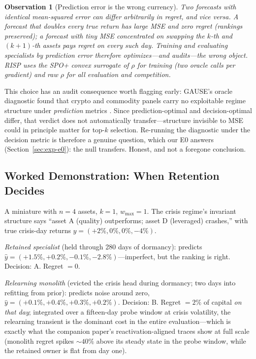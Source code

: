 \documentclass[10pt]{article}
\newtheorem{observation}{Observation}
\newcommand{\nm}{\textsc{RISP}}
\begin{document}
\begin{observation}[Prediction error is the wrong currency]
Two forecasts with identical mean-squared error can differ arbitrarily in
regret, and vice versa. A forecast that doubles every true return has
large MSE and \emph{zero} regret (rankings preserved); a forecast with
tiny MSE concentrated on swapping the $k$-th and $(k{+}1)$-th assets pays
regret on every such day. Training and evaluating specialists by
prediction error therefore optimizes---and audits---the wrong
object. \nm{} uses the SPO+ convex surrogate \cite{elmachtoub2022smart}
of $\rho$ for training (two oracle calls per gradient) and raw $\rho$ for
all evaluation and competition.
\end{observation}

This choice has an audit consequence worth flagging early: GAUSE's oracle
diagnostic found that crypto and commodity panels carry no exploitable
regime structure under \emph{prediction} metrics \cite{li2026gause}.
Since prediction-optimal and decision-optimal differ, that verdict does
not automatically transfer---structure invisible to MSE could in
principle matter for top-$k$ selection. Re-running the diagnostic under
the decision metric is therefore a genuine question, which our E0 answers
(Section~\ref{sec:exp-e0}): the null transfers. Honest, and not a
foregone conclusion.

\subsection{Worked Demonstration: When Retention Decides}

A miniature with $n = 4$ assets, $k = 1$, $w_{\max} = 1$. The crisis
regime's invariant structure says ``asset A (quality) outperforms; asset
D (leveraged) crashes,'' with true crisis-day returns
$y = (+2\%, 0\%, 0\%, -4\%)$.

\emph{Retained specialist} (held through 280 days of dormancy): predicts
$\hat y = (+1.5\%, +0.2\%, -0.1\%, -2.8\%)$---imperfect, but the ranking
is right. Decision: A. Regret $= 0$.

\emph{Relearning monolith} (evicted the crisis head during dormancy; two
days into refitting from prior): predicts noise around zero,
$\hat y = (+0.1\%, +0.4\%, +0.3\%, +0.2\%)$. Decision: B. Regret
$= 2\%$ of capital \emph{on that day}; integrated over a fifteen-day
probe window at crisis volatility, the relearning transient is the
dominant cost in the entire evaluation---which is exactly what the
companion paper's reactivation-aligned traces show at full scale
(monolith regret spikes $\sim 40\%$ above its steady state in the probe
window, while the retained owner is flat from day one).
\end{document}
